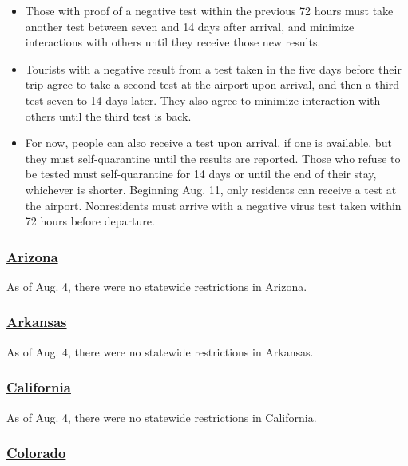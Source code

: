 \begin{itemize}
\item
  Those with proof of a negative test within the previous 72 hours must
  take another test between seven and 14 days after arrival, and
  minimize interactions with others until they receive those new
  results.
\item
  Tourists with a negative result from a test taken in the five days
  before their trip agree to take a second test at the airport upon
  arrival, and then a third test seven to 14 days later. They also agree
  to minimize interaction with others until the third test is back.
\item
  For now, people can also receive a test upon arrival, if one is
  available, but they must self-quarantine until the results are
  reported. Those who refuse to be tested must self-quarantine for 14
  days or until the end of their stay, whichever is shorter. Beginning
  Aug. 11, only residents can receive a test at the airport.
  Nonresidents must arrive with a negative virus test taken within 72
  hours before departure.
\end{itemize}

\hypertarget{arizona}{%
\subsubsection{\texorpdfstring{\href{https://tourism.az.gov/covid-19-updates-2/}{Arizona}}{Arizona}}\label{arizona}}

As of Aug. 4, there were no statewide restrictions in Arizona.

\hypertarget{arkansas}{%
\subsubsection{\texorpdfstring{\href{https://www.arkansas.com/travel-advisory/covid-19}{Arkansas}}{Arkansas}}\label{arkansas}}

As of Aug. 4, there were no statewide restrictions in Arkansas.

\hypertarget{california}{%
\subsubsection{\texorpdfstring{\href{https://www.visitcalifornia.com/latest-covid-19-coronavirus}{California}}{California}}\label{california}}

As of Aug. 4, there were no statewide restrictions in California.

\hypertarget{colorado}{%
\subsubsection{\texorpdfstring{\href{https://covid19.colorado.gov/prepare-protect-yourself/prevent-the-spread/travel}{Colorado}}{Colorado}}\label{colorado}}

